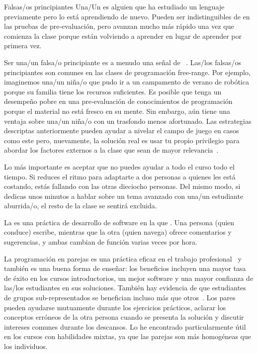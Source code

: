 \begin{aside}{Falsas/os principiantes}
  Una/Un  es alguien
  que ha estudiado un lenguaje previamente pero lo está aprendiendo de nuevo.
  Pueden ser indistinguibles de 
  en las pruebas de pre-evaluación,
  pero avanzan mucho más rápido una vez que comienza la clase
  porque están volviendo a aprender en lugar de aprender por primera vez.
 
  Ser una/un falsa/o principiante es a menudo una señal de ~\cite{Marg2010}.
  Las/los falsas/os principiantes son comunes en las clases de programación free-range.
  Por ejemplo, imaginemos
  una/un niña/o que pudo ir a un campamento de verano de robótica porque su familia tiene los recursos suficientes. Es posible que tenga
  un desempeño pobre en una pre-evaluación de conocimientos de programación
  porque el material no está fresco en su mente. Sin embargo,
  aún tiene una ventaja sobre una/un niña/o con un trasfondo menos afortunado.
  Las estrategias descriptas anteriormente pueden ayudar a nivelar el campo de juego en casos como este
  pero, nuevamente, la solución real es usar tu propio privilegio
  para abordar los factores externos a la clase que sean de mayor relevancia~\cite{Part2011}.
\end{aside}

Lo más importante es aceptar que
no puedes ayudar a todo el curso todo el tiempo.
Si reduces el ritmo para adaptarte a dos personas a quienes les está costando,
estás fallando con las otras dieciocho personas.
Del mismo modo,
si dedicas unos minutos a hablar sobre un tema avanzado con una/un estudiante aburrida/o,
el resto de la clase se sentirá excluida.


La  es una práctica de desarrollo de software
en la que .
Una persona (quien conduce) escribe,
mientras que la otra (quien navega) ofrece comentarios y sugerencias,
y ambas cambian de función varias veces por hora.

La programación en parejas es una práctica eficaz en el trabajo profesional~\cite{Hann2009}
y también es una buena forma de enseñar:
los beneficios incluyen una mayor tasa de éxito en los cursos introductorios,
un mejor software
y una mayor confianza de las/los estudiantes en sus soluciones.
También hay evidencia de que estudiantes de grupos sub-representados
se benefician incluso más que otros~\cite{McDo2006,Hank2011,Port2013,Cele2018}.
Los pares pueden ayudarse mutuamente durante los ejercicios prácticos,
aclarar los conceptos erróneos de la otra persona cuando se presenta la solución
y discutir intereses comunes durante los descansos.
Lo he encontrado particularmente útil en los cursos con habilidades mixtas,
ya que las parejas son más homogéneas que los individuos.

